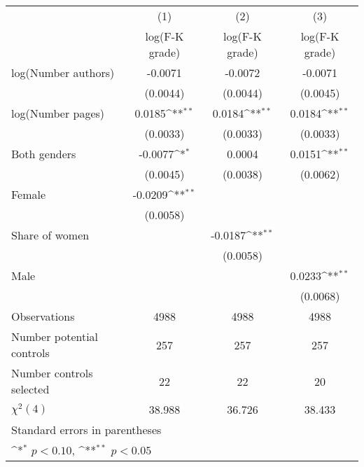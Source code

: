 {
\def\sym#1{\ifmmode^{#1}\else\(^{#1}\)\fi}
\begin{tabular}{l*{3}{c}}
\hline\hline
                    &\multicolumn{1}{c}{(1)}&\multicolumn{1}{c}{(2)}&\multicolumn{1}{c}{(3)}\\
                    &\multicolumn{1}{c}{log(F-K grade)}&\multicolumn{1}{c}{log(F-K grade)}&\multicolumn{1}{c}{log(F-K grade)}\\
\hline
\hspace{3mm}log(Number authors)&     -0.0071        &     -0.0072        &     -0.0071        \\
                    &    (0.0044)        &    (0.0044)        &    (0.0045)        \\
[1em]
\hspace{3mm}log(Number pages)&      0.0185\sym{**}&      0.0184\sym{**}&      0.0184\sym{**}\\
                    &    (0.0033)        &    (0.0033)        &    (0.0033)        \\
[1em]
\hspace{3mm}Both genders&     -0.0077\sym{*} &      0.0004        &      0.0151\sym{**}\\
                    &    (0.0045)        &    (0.0038)        &    (0.0062)        \\
[1em]
\hspace{3mm}Female  &     -0.0209\sym{**}&                    &                    \\
                    &    (0.0058)        &                    &                    \\
[1em]
\hspace{3mm}Share of women&                    &     -0.0187\sym{**}&                    \\
                    &                    &    (0.0058)        &                    \\
[1em]
\hspace{3mm}Male    &                    &                    &      0.0233\sym{**}\\
                    &                    &                    &    (0.0068)        \\
\hline
Observations        &        4988        &        4988        &        4988        \\
Number potential controls&         257        &         257        &         257        \\
Number controls selected&          22        &          22        &          20        \\
$\chi^2(4)$         &      38.988        &      36.726        &      38.433        \\
\hline\hline
\multicolumn{4}{l}{\footnotesize Standard errors in parentheses}\\
\multicolumn{4}{l}{\footnotesize \sym{*} \(p<0.10\), \sym{**} \(p<0.05\)}\\
\end{tabular}
}
